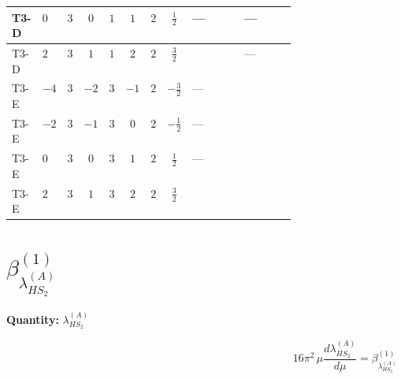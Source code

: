 \documentclass[8pt]{article}
\begin{document}
\begin{landscape}
\begin{longtable}{@{}llcccccc >{\raggedright\arraybackslash}p{0.21\linewidth} >{\raggedright\arraybackslash}p{0.21\linewidth}@{}}
\midrule
T3-D & $0$ & $3$ & $0$ & $1$ & $1$ & $2$ & $\frac{1}{2}$ & --- & --- \\
\midrule
T3-D & $2$ & $3$ & $1$ & $1$ & $2$ & $2$ & $\frac{3}{2}$ & \scriptsize\adjustbox{max width=\linewidth}{$\begin{gathered} +{g_1}^2 \left(4 {g_2}^2-\frac{15 {\lambda_{HS_1}^{(A)}}}{2}\right)\end{gathered}$} & --- \\
\midrule
T3-E & $-4$ & $3$ & $-2$ & $3$ & $-1$ & $2$ & $-\frac{3}{2}$ & --- & \scriptsize\adjustbox{max width=\linewidth}{$\begin{gathered} +12 {\lambda_{12}^{(A)}} {\lambda_{HS_2}^{(A)}}\end{gathered}$} \\
\midrule
T3-E & $-2$ & $3$ & $-1$ & $3$ & $0$ & $2$ & $-\frac{1}{2}$ & --- & \scriptsize\adjustbox{max width=\linewidth}{$\begin{gathered} +12 {\lambda_{12}^{(A)}} {\lambda_{HS_2}^{(A)}}\end{gathered}$} \\
\midrule
T3-E & $0$ & $3$ & $0$ & $3$ & $1$ & $2$ & $\frac{1}{2}$ & --- & \scriptsize\adjustbox{max width=\linewidth}{$\begin{gathered} +12 {\lambda_{12}^{(A)}} {\lambda_{HS_2}^{(A)}}\end{gathered}$} \\
\midrule
T3-E & $2$ & $3$ & $1$ & $3$ & $2$ & $2$ & $\frac{3}{2}$ & \scriptsize\adjustbox{max width=\linewidth}{$\begin{gathered} +{g_1}^2 \left(4 {g_2}^2-\frac{15 {\lambda_{HS_1}^{(A)}}}{2}\right)\end{gathered}$} & \scriptsize\adjustbox{max width=\linewidth}{$\begin{gathered} +12 {\lambda_{12}^{(A)}} {\lambda_{HS_2}^{(A)}}\end{gathered}$} \\
\midrule
\bottomrule
\end{longtable}
\clearpage
\section*{$\beta_{\lambda_{HS_2}^{(A)}}^{(1)}$}
\noindent\textbf{Quantity: }$\lambda_{HS_2}^{(A)}$\par\smallskip
\[16\pi^2\,\mu\frac{d \lambda_{HS_2}^{(A)}}{d\mu}=\beta_{\lambda_{HS_2}^{(A)}}^{(1)}\]

\end{landscape}
\end{document}
